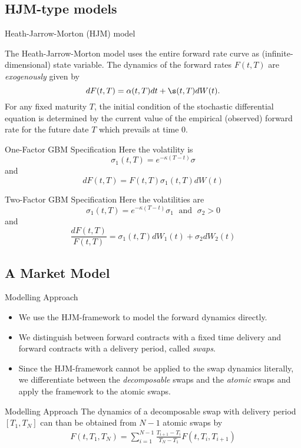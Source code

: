 \subsection{HJM-type models}

{ Heath-Jarrow-Morton (HJM) model}

The Heath-Jarrow-Morton model uses the entire forward rate curve as
(infinite-dimensional) state variable. The dynamics of the forward rates $F(t,T)$ are {\it exogenously} given by
$$
dF(t,T) = \alpha(t,T) dt + \s(t,T) dW(t).
$$
For any fixed maturity $T$, the
initial condition of the stochastic differential equation
is determined by the current value
of the empirical (observed) forward rate for the future date $T$
which prevails at time $0$.



{One-Factor GBM Specification}
Here the volatility is
$$
\sigma_1(t,T)=e^{-\kappa (T-t)}\sigma
$$
and
$$
dF(t,T)=F(t,T)\sigma_1(t,T)dW(t)
$$


{Two-Factor GBM Specification}
Here the volatilities are
$$
\sigma_1(t,T)=e^{-\kappa (T-t)}\sigma_1 \; \mbox{ and } \; \sigma_2>0
$$
and
$$
\frac{dF(t,T)}{F(t,T)}=\sigma_1(t,T)dW_1(t)+\sigma_2dW_2(t)
$$


\subsection{A Market Model}

{Modelling Approach}
\begin{itemize}
\item<1-> We use the HJM-framework to model the forward dynamics directly.
\item<2-> We distinguish between forward contracts with a fixed time delivery and forward contracts with a delivery period, called \emph{swaps}.
\item<3-> Since the HJM-framework cannot be applied to the swap dynamics literally, we differentiate between the \emph{decomposable} swaps and the \emph{atomic} swaps and apply the framework to the atomic swaps.
\end{itemize}



{Modelling Approach}
The dynamics of a decomposable swap with delivery period $[T_1,T_{N}]$ can than be obtained from $N-1$ atomic swaps by
\begin{align}
F(t,T_1,T_N)=\sum\limits_{i=1}^{N-1} \frac{T_{i+1}-T_i}{T_N-T_1} F(t,T_i,T_{i+1})\label{eqn: decomposbale swap}
\end{align}



